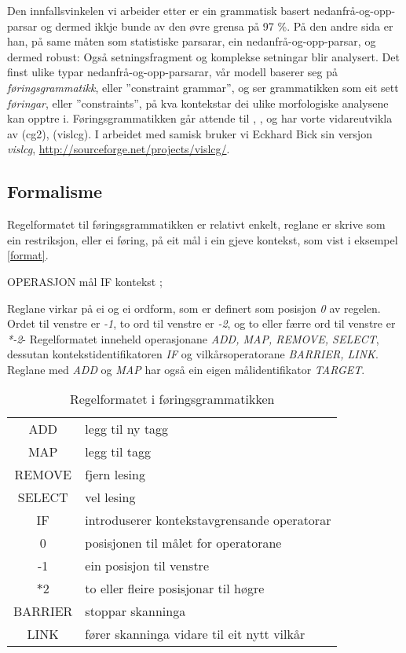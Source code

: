 \documentclass[a4paper,norsk]{article}
\begin{document}
Den innfallsvinkelen vi arbeider etter er ein grammatisk basert nedanfrå-og-opp-parsar og dermed ikkje bunde av den øvre grensa på 97 \%. På den andre sida er han, på same måten som statistiske parsarar, ein nedanfrå-og-opp-parsar, og dermed robust: Også setningsfragment og komplekse setningar blir analysert. Det finst ulike typar nedanfrå-og-opp-parsarar, vår modell baserer seg på \emph{føringsgrammatikk}, eller ''constraint grammar'', og ser grammatikken som eit sett \emph{føringar}, eller ''constraints'', på kva kontekstar dei ulike morfologiske analysene kan opptre i. Føringsgrammatikken går attende til \cite{Karlsson90}, \cite{Karlsson95}, og har vorte vidareutvikla av \cite{Tapanainen96} (cg2), \cite{Bick00} (vislcg). I arbeidet med samisk bruker vi Eckhard Bick sin versjon \emph{vislcg}, \url{http://sourceforge.net/projects/vislcg/}.%

\subsection{Formalisme}

Regelformatet til føringsgrammatikken er relativt enkelt, reglane er skrive som ein restriksjon, eller ei føring, på eit mål i ein gjeve kontekst, som vist i eksempel \ref{format}. %

\begin{example}\label{format}
OPERASJON mål IF kontekst ;
\end{example}

Reglane virkar på ei og ei ordform, som er definert som posisjon \emph{0} av regelen. Ordet til venstre er \emph{-1}, to ord til venstre er \emph{-2}, og to eller færre ord til venstre er \emph{*-2}- Regelformatet inneheld operasjonane \emph{ADD, MAP, REMOVE, SELECT}, dessutan kontekstidentifikatoren \emph{IF} og vilkårsoperatorane \emph{BARRIER, LINK}. Reglane med \emph{ADD} og \emph{MAP} har også ein eigen målidentifikator \emph{TARGET}.%

\begin{table}[htdp]
\caption{Regelformatet i føringsgrammatikken}
\begin{center}
\begin{tabular}{|c|l|}
\hline
 ADD & legg til ny tagg \\
 MAP & legg til tagg \\
 REMOVE & fjern lesing \\
 SELECT & vel lesing \\
\hline 
 IF & introduserer kontekstavgrensande operatorar \\
\hline 
 0 & posisjonen til målet for operatorane \\
 -1 & ein posisjon til venstre \\
 $\ast2$ & to eller fleire posisjonar til høgre \\
\hline 
 BARRIER & stoppar skanninga \\
 LINK & fører skanninga vidare til eit nytt vilkår \\
\hline 
\end{tabular}
\end{center}
\label{default}
\end{table}%
\end{document}
